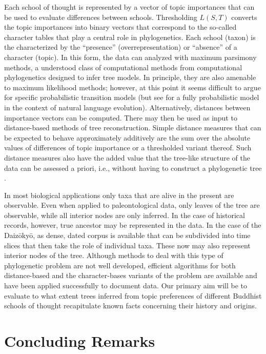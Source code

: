 \documentclass[a4paper,10pt]{article}
\begin{document}
Each school of thought is represented by a vector of topic importances that
can be used to evaluate differences between schools. Thresholding $L(S,T)$
converts the topic importances into binary vectors that correspond to the
so-called character tables that play a central role in phylogenetics. Each
school (taxon) is the characterized by the ``presence''
(overrepresentation) or ``absence'' of a character (topic).  In this form,
the data can analyzed with maximum parsimony methods, a understood class of
computational methods from computational phylogenetics designed to infer
tree models. In principle, they are also amenable to maximum likelihood
methods; however, at this point it seems difficult to argue for specific
probabilistic transition models (but see \cite{Hruschka:15} for a fully
probabilistic model in the context of natural language
evolution). Alternatively, distances between importance vectors can be
computed. There may then be used as input to distance-based methods of tree
reconstruction. Simple distance measures that can be expected to behave
approximately additively are the sum over the absolute values of
differences of topic importance or a thresholded variant thereof. Such
distance measures also have the added value that the tree-like structure of
the data can be assessed a priori, i.e., without having to construct a
phylogenetic tree \cite{Misof:14}.

In most biological applications only taxa that are alive in the present are
observable. Even when applied to paleontological data, only leaves of the
tree are observable, while all interior nodes are only inferred. In the
case of historical records, however, true ancestor may be represented in
the data. In the case of the Daiz{\=o}ky{\=o}, as dense, dated corpus is
available that can be subdivided into time slices that then take the role
of individual taxa. These now may also represent interior nodes of the
tree. Although methods to deal with this type of phylogenetic problem are
not well developed, efficient algorithms for both distance-based and the
character-bases variants of the problem are available \cite{Telles:13} and
have been applied successfully to document data. Our primary aim will
  be to evaluate to what extent trees inferred from topic preferences of
  different Buddhist schools of thought recapitulate known facts concerning
  their history and origins.

\section{Concluding Remarks} 
\end{document}
